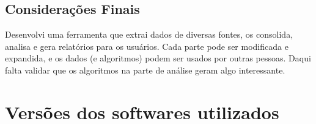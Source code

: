 \documentclass[a4paper,titlepage]{ppgi}\usepackage[]{graphicx}\usepackage[]{color}
\begin{document}









\section{Considerações Finais}

Desenvolvi uma ferramenta que extrai dados de diversas fontes, os consolida, analisa e gera relatórios para os usuários. Cada parte pode ser modificada e expandida, e os dados (e algoritmos) podem ser usados por outras pessoas. Daqui falta validar que os algoritmos na parte de análise geram algo interessante.






\appendix


\chapter{Versões dos softwares utilizados}
\end{document}
